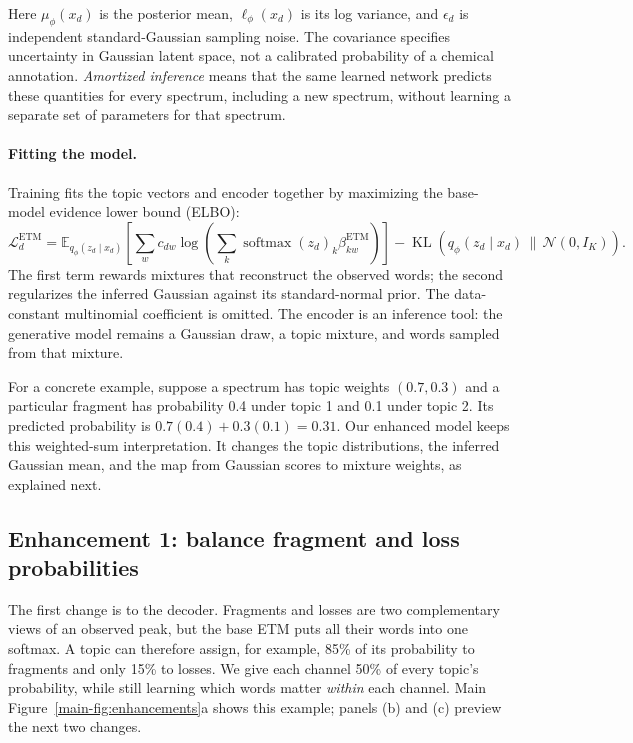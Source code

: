 \documentclass[10pt,a4paper]{article}
\newcommand{\softmax}{\operatorname{softmax}}
\newcommand{\KL}{\operatorname{KL}}
\begin{document}
Here $\mu_\phi(x_d)$ is the posterior mean, $\ell_\phi(x_d)$ is its log variance,
and $\epsilon_d$ is independent standard-Gaussian sampling noise.
The covariance specifies uncertainty in Gaussian latent space, not a
calibrated probability of a chemical annotation. \emph{Amortized inference}
means that the same learned network predicts these quantities for every
spectrum, including a new spectrum, without learning a separate set of
parameters for that spectrum.

\paragraph{Fitting the model.}
Training fits the topic vectors and encoder together by maximizing the
base-model evidence lower bound (ELBO):
\begin{equation}
 \mathcal L_d^{\mathrm{ETM}}=
 \mathbb E_{q_\phi(z_d\mid x_d)}
 \left[\sum_w c_{dw}\log\left(
   \sum_k\softmax(z_d)_k\beta^{\mathrm{ETM}}_{kw}\right)\right]
 -\KL\!\left(q_\phi(z_d\mid x_d)\,\|\,\mathcal N(0,I_K)\right).
 \label{eq:base-elbo}
\end{equation}
The first term rewards mixtures that reconstruct the observed words; the
second regularizes the inferred Gaussian against its standard-normal prior.
The data-constant multinomial coefficient is omitted. The encoder is an
inference tool: the generative model remains a Gaussian draw, a topic mixture,
and words sampled from that mixture.

For a concrete example, suppose a spectrum has topic weights $(0.7,0.3)$
and a particular fragment has probability 0.4 under topic 1 and 0.1 under
topic 2. Its predicted probability is $0.7(0.4)+0.3(0.1)=0.31$.
Our enhanced model keeps this weighted-sum interpretation. It changes the
topic distributions, the inferred Gaussian mean, and the map from Gaussian
scores to mixture weights, as explained next.

\subsection{Enhancement 1: balance fragment and loss probabilities}
\label{sec:balance}

The first change is to the decoder. Fragments and losses are two
complementary views of an observed peak, but the base ETM puts all their
words into one softmax. A topic can therefore assign, for example, 85\% of
its probability to fragments and only 15\% to losses. We give each channel
50\% of every topic's probability, while still learning which words matter
\emph{within} each channel. Main Figure~\ref{main-fig:enhancements}a shows this example;
panels (b) and (c) preview the next two changes.
\end{document}
